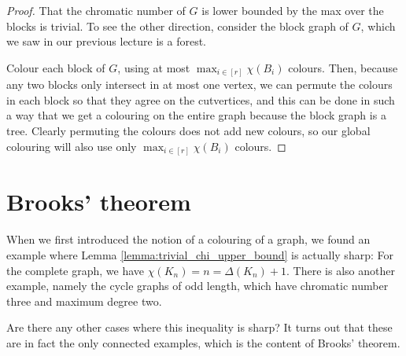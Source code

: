 \documentclass[nobib]{tufte-handout}
\newtheorem{xca}{Exercise}
\begin{document}
  \begin{proof}
    That the chromatic number of $G$ is lower bounded by the max over the blocks is trivial. To see the other direction, consider the block graph of $G$, which we saw in our previous lecture is a forest.

    Colour each block of $G$, using at most $\max_{i\in[r]} \chi(B_i)$ colours. Then, because any two blocks only intersect in at most one vertex, we can permute the colours in each block so that they agree on the cutvertices, and this can be done in such a way that we get a colouring on the entire graph because the block graph is a tree. 
    Clearly permuting the colours does not add new colours, so our global colouring will also use only $\max_{i\in[r]} \chi(B_i)$ colours.
  \end{proof}


\section{Brooks' theorem}

When we first introduced the notion of a colouring of a graph, we found an example where Lemma \ref{lemma:trivial_chi_upper_bound} is actually sharp: For the complete graph, we have $\chi(K_n) = n = \Delta(K_n) + 1$. There is also another example, namely the cycle graphs of odd length, which have chromatic number three and maximum degree two.

Are there any other cases where this inequality is sharp? It turns out that these are in fact the only connected examples, which is the content of Brooks' theorem.
\end{document}
